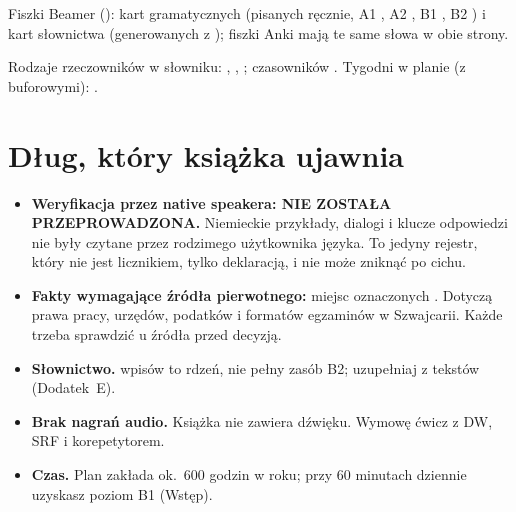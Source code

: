 Fiszki Beamer ():  kart gramatycznych (pisanych ręcznie, A1 , A2 ,
B1 , B2 ) i  kart słownictwa (generowanych z ); fiszki Anki mają te same słowa w obie strony.

Rodzaje rzeczowników w słowniku:  ,  ,  ; czasowników .
Tygodni w planie (z buforowymi): .

\section*{Dług, który książka ujawnia}
\begin{itemize}
\item \textbf{Weryfikacja przez native speakera: NIE ZOSTAŁA PRZEPROWADZONA.} Niemieckie przykłady, dialogi i klucze odpowiedzi nie były czytane przez
rodzimego użytkownika języka. To jedyny rejestr, który nie jest licznikiem, tylko deklaracją, i nie może zniknąć po cichu.
\item \textbf{Fakty wymagające źródła pierwotnego: } miejsc oznaczonych . Dotyczą prawa pracy, urzędów, podatków i
formatów egzaminów w Szwajcarii. Każde trzeba sprawdzić u źródła przed decyzją.
\item \textbf{Słownictwo.}  wpisów to rdzeń, nie pełny zasób B2; uzupełniaj z tekstów (Dodatek~E).
\item \textbf{Brak nagrań audio.} Książka nie zawiera dźwięku. Wymowę ćwicz z DW, SRF i korepetytorem.
\item \textbf{Czas.} Plan zakłada ok.\ 600 godzin w roku; przy 60 minutach dziennie uzyskasz poziom B1 (Wstęp).
\end{itemize}
